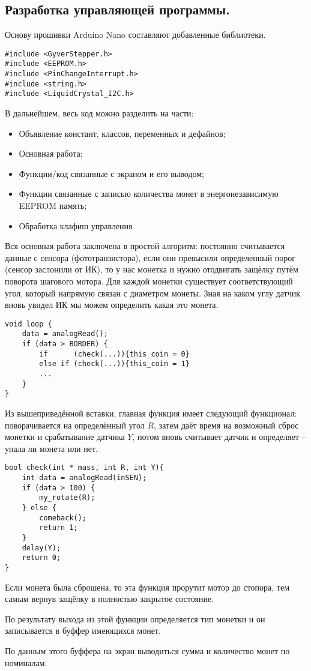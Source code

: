 \subsection{Разработка управляющей программы.}

Основу прошивки Arduino Nano составляют добавленные библиотеки.

\begin{lstlisting}[frame=single]
#include <GyverStepper.h>
#include <EEPROM.h>
#include <PinChangeInterrupt.h>
#include <string.h>
#include <LiquidCrystal_I2C.h>
\end{lstlisting}

В дальнейшем, весь код можно разделить на части:

\begin{itemize}
	\item Объявление констант, классов, переменных и дефайнов;
	\item Основная работа;
	\item Функции/код связанные с экраном и его выводом;
	\item Функции связанные с записью количества монет в энергонезависимую EEPROM память;
	\item Обработка клафиш управления
\end{itemize}

Вся основная работа заключена в простой алгоритм: постоянно считывается данные с сенсора (фототранзистора), если они превысили определенный порог (сенсор заслонили от ИК), то у нас монетка и нужно отодвигать защёлку путём поворота шагового мотора. Для каждой монетки существует соответствующий угол, который напрямую связан с диаметром монеты. Зная на каком углу датчик вновь увидел ИК мы можем определить какая это монета.

\begin{lstlisting}[frame=single]
void loop {
	data = analogRead();
	if (data > BORDER) {
		if      (check(...)){this_coin = 0}
		else if (check(...)){this_coin = 1}
		...
	}
}
\end{lstlisting}

Из вышеприведённой вставки, главная функция имеет следующий функционал: поворачивается на определённый угол $R$, затем даёт время на возможный сброс монетки и срабатывание датчика $Y$, потом вновь считывает датчик и определяет -- упала ли монета или нет. 
\par\medskip

\begin{lstlisting}[frame=single]
bool check(int * mass, int R, int Y){
	int data = analogRead(inSEN);
	if (data > 100) {
		my_rotate(R);
	} else {
		comeback();
		return 1;
	}
	delay(Y);
	return 0;
}
\end{lstlisting}
Если монета была сброшена, то эта функция прорутит мотор до стопора, тем самым вернув защёлку в полностью закрытое состояние.
\par\medskip

По результату выхода из этой функции определяется тип монетки и он записывается в буффер имеющихся монет.
\par\medskip

По данным этого буффера на экран выводиться сумма и количество монет по номиналам.
\par\medskip